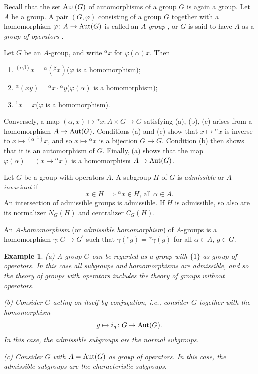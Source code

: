 \documentclass[a4paper,11pt,final]{memoir}%
\newtheorem{example}[X]{Example}
\theoremstyle{nonumberplain}
\begin{document}
Recall that the set $\operatorname{Aut}(G)$ of automorphisms of a group $G$ is again a
group. Let $A$ be a group. A pair $(G,\varphi)$ consisting of a group $G$
together with a homomorphism $\varphi\colon A\rightarrow\operatorname{Aut}(G)$ is called an
$A$\emph{-group}%
%
, or $G$ is said to have $A$ as a \emph{group of operators}%
%
.

Let $G$ be an $A$-group, and write $^{\alpha}x$ for $\varphi(\alpha)x$. Then

\begin{enumerate}
\item $^{(\alpha\beta)}x={}^{\alpha}({}^{\beta}x)$\qquad($\varphi$ is a homomorphism);

\item $^{\alpha}(xy)={}^{\alpha}x\cdot{}^{\alpha}y$\qquad($\varphi(\alpha)$ is
a homomorphism);{}

\item $^{1}x=x$\qquad\qquad($\varphi$ is a homomorphism).
\end{enumerate}

\noindent Conversely, a map $(\alpha,x)\mapsto{}^{\alpha}x:A\times
G\rightarrow G$ satisfying (a), (b), (c) arises from a homomorphism
$A\rightarrow\operatorname{Aut}(G)$. Conditions (a) and (c) show that $x\mapsto{}^{\alpha}x$
is inverse to $x\mapsto{}^{(\alpha^{-1})}x$, and so $x\mapsto{}^{\alpha}x$ is
a bijection $G\rightarrow G$. Condition (b) then shows that it is an
automorphism of $G$. Finally, (a) shows that the map $\varphi(\alpha
)=(x\mapsto{}^{\alpha}x)$ is a homomorphism $A\rightarrow\operatorname{Aut}(G)$.

Let $G$ be a group with operators $A$. A subgroup $H$ of $G$ is
\emph{admissible}%
%
\emph{\/} or $A$-\emph{invariant\/}%
if
\[
x\in H\implies{}^{\alpha}x\in H\text{, all }\alpha\in A.
\]
An intersection of admissible groups is admissible. If $H$ is admissible, so
also are its normalizer $N_{G}(H)$ and centralizer $C_{G}(H).$

An $A$\emph{-homomorphism\/} (or \emph{admissible homomorphism\/})%
of $A$-groups is a homomorphism $\gamma\colon G\rightarrow G^{\prime}$ such
that $\gamma({}^{\alpha}g)={}^{\alpha}\gamma(g)$ for all $\alpha\in A$, $g\in
G.$

\begin{example}
\label{ns23}(a) A group $G$ can be regarded as a group with $\{1\}$ as group
of operators. In this case all subgroups and homomorphisms are admissible, and
so the theory of groups with operators includes the theory of groups without operators.

(b) Consider $G$ acting on itself by conjugation, i.e., consider $G$ together
with the homomorphism
\[
g\mapsto i_{g}\colon G\rightarrow\operatorname{Aut}(G).
\]
In this case, the admissible subgroups are the normal subgroups.

(c) Consider $G$ with $A=\operatorname{Aut}(G)$ as group of operators. In this case, the
admissible subgroups are the characteristic subgroups.
\end{example}
\end{document}
